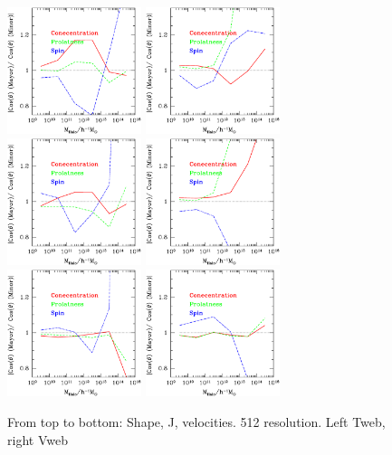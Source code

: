 \documentclass[usenatbib]{mn2e}
\begin{document}
\begin{figure}
\includegraphics[width=0.35\textwidth]{../tmp/Type/T_Web_512.ps}
\includegraphics[width=0.35\textwidth]{../tmp/Type/V_Web_512.ps}
\includegraphics[width=0.35\textwidth]{../tmp/Type/JT_Web_512.ps}
\includegraphics[width=0.35\textwidth]{../tmp/Type/JV_Web_512.ps}
\includegraphics[width=0.35\textwidth]{../tmp/Type/vT_Web_512.ps}
\includegraphics[width=0.35\textwidth]{../tmp/Type/vV_Web_512.ps}
\caption{From top to bottom: Shape, J, velocities. 512 resolution. Left Tweb, right Vweb}
\end{figure}
\end{document}
